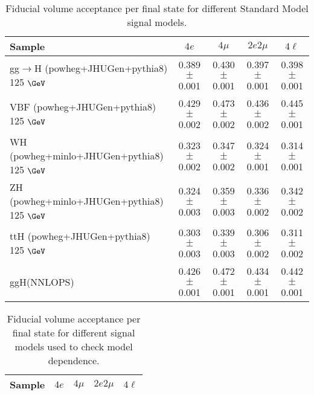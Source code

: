 \documentclass{article}
\begin{document}
\begin{table}[!h!tb]
\begin{center}
\small
\caption{
Fiducial volume acceptance per final state for different Standard Model signal models.
\label{tab:acceptanceSM}
}
\begin{tabular}{|l|c|c|c|c|} \hline 
Sample & $4e$ & $4\mu$ & $2e2\mu$ & $4\ell$ \\ \hline 
gg$\rightarrow$H ({\sc powheg+JHUGen+pythia8}) 125 $\GeV$ & 0.389 $\pm$ 0.001 & 0.430 $\pm$ 0.001 & 0.397 $\pm$ 0.001 & 0.398 $\pm$ 0.001 \\ 
VBF ({\sc powheg+JHUGen+pythia8}) 125 $\GeV$ & 0.429 $\pm$ 0.002 & 0.473 $\pm$ 0.002 & 0.436 $\pm$ 0.002 & 0.445 $\pm$ 0.001 \\ 
WH ({\sc powheg+minlo+JHUGen+pythia8}) 125 $\GeV$ & 0.323 $\pm$ 0.002 & 0.347 $\pm$ 0.002 & 0.324 $\pm$ 0.001 & 0.314 $\pm$ 0.001 \\ 
ZH ({\sc powheg+minlo+JHUGen+pythia8}) 125 $\GeV$ & 0.324 $\pm$ 0.003 & 0.359 $\pm$ 0.003 & 0.336 $\pm$ 0.002 & 0.342 $\pm$ 0.002 \\ 
ttH ({\sc powheg+JHUGen+pythia8}) 125 $\GeV$ & 0.303 $\pm$ 0.003 & 0.339 $\pm$ 0.003 & 0.306 $\pm$ 0.002 & 0.311 $\pm$ 0.002 \\ 
ggH(NNLOPS) & 0.426 $\pm$ 0.001 & 0.472 $\pm$ 0.001 & 0.434 $\pm$ 0.001 & 0.442 $\pm$ 0.001 \\ 

\hline
\end{tabular}
\normalsize
\end{center}
\end{table}
 
 
 
\begin{table}[!h!tb]
\begin{center}
\small
\caption{
Fiducial volume acceptance per final state for different signal models used to check model dependence.
\label{tab:acceptanceExo}
}
\begin{tabular}{|l|c|c|c|c|} \hline 
Sample & $4e$ & $4\mu$ & $2e2\mu$ & $4\ell$ \\ \hline 

\hline
\end{tabular}
\normalsize
\end{center}
\end{table}
 
 
 
\end{document}
